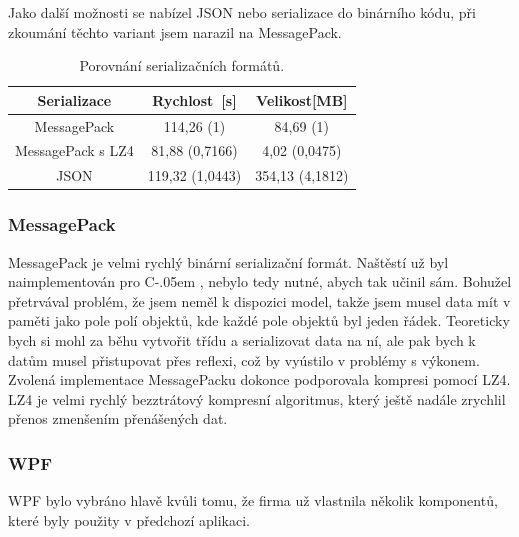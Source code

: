 \documentclass[czech,bachelor,dept460,male,csharp]{diploma}
\newcommand{\EFilters}{Evolio~Power~Reporting}
\newcommand{\Csharp}{%
  {\settoheight{\dimen0}{C}C\kern-.05em \resizebox{!}{\dimen0}{\raisebox{\depth}{\#}}}}
\begin{document}
			Jako další možnosti se nabízel JSON nebo serializace do binárního kódu, při zkoumání těchto variant jsem narazil na MessagePack.
			\begin{table}[h!]
				\centering
				\begin{tabular}{|c|c|c|} 
 					\hline
 					Serializace & Rychlost\footnotemark\ [s] & Velikost[MB] \\\hline\hline
 					MessagePack & 114,26 (1)\footnotemark & 84,69 (1)\footnotemark[\value{footnote}] 	\\\hline
 					MessagePack s LZ4 & 81,88 (0,7166)\footnotemark[\value{footnote}] & 4,02 (0,0475)\footnotemark[\value{footnote}]   \\\hline
 					JSON & 119,32 (1,0443)\footnotemark[\value{footnote}]  & 354,13 (4,1812)\footnotemark[\value{footnote}] 	\\\hline
				\end{tabular}
				
				\caption{Porovnání serializačních formátů.}
				\label{table:serilization}
			\end{table}
			 
			 
		\subsubsection{MessagePack}
			MessagePack\cite{mpSpec} je velmi rychlý binární serializační formát. Naštěstí už byl naimplementován pro {\Csharp}, nebylo tedy nutné, abych tak učinil sám. Bohužel přetrvával problém, že jsem neměl k dispozici model, takže jsem musel data mít v paměti jako pole polí objektů, kde každé pole objektů byl jeden řádek. Teoreticky bych si mohl za běhu vytvořit třídu a serializovat data na ní, ale pak bych k datům musel přistupovat přes reflexi, což by vyústilo v problémy s výkonem. Zvolená implementace MessagePacku\cite{mpImpl} dokonce podporovala kompresi pomocí LZ4. LZ4\cite{l4z} je velmi rychlý bezztrátový kompresní algoritmus, který ještě nadále zrychlil přenos zmenšením přenášených dat. 
 
		\subsubsection{WPF}
			WPF bylo vybráno hlavě kvůli tomu, že firma už vlastnila několik komponentů, které byly použity v předchozí aplikaci.
			
\end{document}
